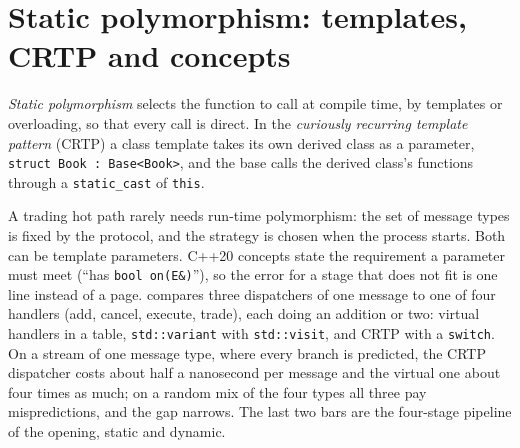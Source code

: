 \section{Static polymorphism: templates, CRTP and concepts}

\begin{definition}\label{def:ll:cpp-for-latency-ii-compile-time:static}
\emph{Static polymorphism} selects the function to call at compile time, by templates or
overloading, so that every call is direct. In the \emph{curiously recurring template pattern} (CRTP) a class template takes its own derived class as a parameter, \texttt{struct Book : Base<Book>},
and the base calls the derived class's functions through a \texttt{static\_cast} of \texttt{this}.
\end{definition}

A trading hot path rarely needs run-time polymorphism: the set of message types is fixed by the protocol, and the strategy
is chosen when the process starts. Both can be template parameters. C++20 concepts state the requirement a parameter must
meet (``has \texttt{bool on(E\&)}''), so the error for a stage that does not fit is one line instead of a page.
 compares three dispatchers of one message to one of four handlers
(add, cancel, execute, trade), each doing an addition or two: virtual handlers in a table, \texttt{std::variant} with
\texttt{std::visit}, and CRTP with a \texttt{switch}. On a stream of one message type, where every branch is predicted, the
CRTP dispatcher costs about half a nanosecond per message and the virtual one about four times as much; on a random mix of
the four types all three pay mispredictions, and the gap narrows. The last two bars are the four-stage pipeline of the
opening, static and dynamic.

